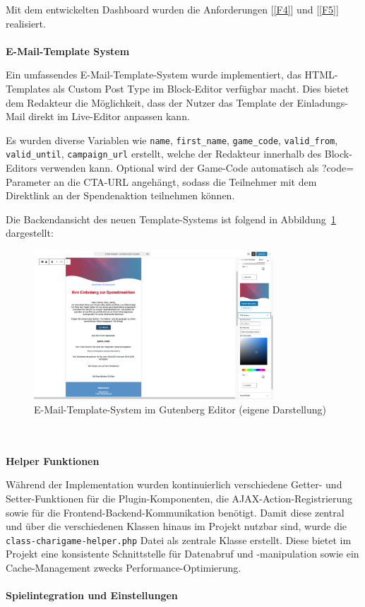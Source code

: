 Mit dem entwickelten Dashboard wurden die Anforderungen [\ref{F4}] und [\ref{F5}] realisiert.
\\\\
\textbf{E-Mail-Template System}

Ein umfassendes E-Mail-Template-System wurde implementiert, das HTML-Templates als Custom Post Type im Block-Editor verfügbar macht.
Dies bietet dem Redakteur die Möglichkeit, dass der Nutzer das Template der Einladungs-Mail direkt im Live-Editor anpassen kann.

Es wurden diverse Variablen wie \texttt{name}, \texttt{first\_name}, \texttt{game\_code}, \texttt{valid\_from},\\ \texttt{valid\_until}, \texttt{campaign\_url} erstellt, welche der Redakteur innerhalb des Block-Editors verwenden kann.
Optional wird der Game-Code automatisch als ?code= Parameter an die CTA-URL angehängt, sodass die Teilnehmer mit dem Direktlink an der Spendenaktion teilnehmen können.

Die Backendansicht des neuen Template-Systems ist folgend in Abbildung~\ref{fig:new-email-backend} dargestellt:

\begin{figure}[H]
    \centering
    \includegraphics[width=0.8\textwidth]{images/new_email_backend}
    \caption{E-Mail-Template-System im Gutenberg Editor (eigene Darstellung)}
    \label{fig:new-email-backend}
\end{figure}

\\\\
\textbf{Helper Funktionen}

Während der Implementation wurden kontinuierlich verschiedene Getter- und Setter-Funktionen für die Plugin-Komponenten, die AJAX-Action-Registrierung sowie für die Frontend-Backend-Kommunikation benötigt.
Damit diese zentral und über die verschiedenen Klassen hinaus im Projekt nutzbar sind, wurde die\\ \texttt{class-charigame-helper.php} Datei als zentrale Klasse erstellt.
Diese bietet im Projekt eine konsistente Schnittstelle für Datenabruf und -manipulation sowie ein Cache-Management zwecks Performance-Optimierung.
\\\\
\textbf{Spielintegration und Einstellungen}

